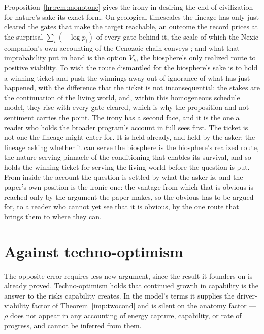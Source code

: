 \begin{remark}\label{hr:rem:winnersirony}
Proposition~\ref{hr:rem:monotone} gives the irony in desiring the end
of civilization for nature's sake its exact form. On geological
timescales the lineage has only just cleared the gates that make the
target reachable, an outcome the record prices at the surprisal
$\sum_i(-\log p_i)$ of every gate behind it, the scale of which the
Nexic companion's own accounting of the Cenozoic chain conveys
\cite{Nexus}; and what that improbability put in hand is the option
$V_k$, the biosphere's only realized route to positive viability.
To wish the route dismantled for the biosphere's sake is to hold a
winning ticket and push the winnings away out of ignorance of what has
just happened, with the difference that the ticket is not
inconsequential: the stakes are the continuation of the living world,
and, within this homogeneous schedule model, they rise with every gate
cleared, which is why the proposition and not sentiment carries the
point.
The irony has a second face, and it is the one a reader who holds the
broader program's account in full sees first. The ticket is not one the
lineage might enter for. It is held already, and held by the asker: the
lineage asking whether it can serve the biosphere is the biosphere's
realized route, the nature-serving pinnacle of the conditioning that
enables its survival, and so holds the winning ticket for serving the
living world before the question is put. From inside the account the
question is settled by what the asker is, and the paper's own position is
the ironic one: the vantage from which that is obvious is reached only by
the argument the paper makes, so the obvious has to be argued for, to a
reader who cannot yet see that it is obvious, by the one route that brings
them to where they can.
\end{remark}

\section{Against techno-optimism}\label{sec:optimism}


The opposite error requires less new argument, since the result it
founders on is already proved. Techno-optimism holds that continued growth in capability is the answer
to the risks capability creates. In the model's terms it supplies the
driver-viability factor of Theorem~\ref{imp:twocond} and is silent on
the anatomy factor --- $\rho$ does not appear in any accounting of energy
capture, capability, or rate of progress, and cannot be inferred from
them.

